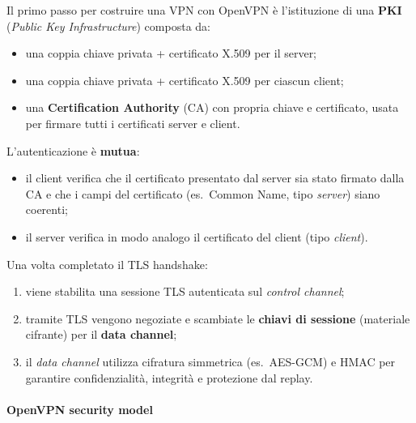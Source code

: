 Il primo passo per costruire una VPN con OpenVPN è l’istituzione di una \textbf{PKI}
(\textit{Public Key Infrastructure}) composta da:
\begin{itemize}
    \item una coppia chiave privata + certificato X.509 per il server;
    \item una coppia chiave privata + certificato X.509 per ciascun client;
    \item una \textbf{Certification Authority} (CA) con propria chiave e certificato,
          usata per firmare tutti i certificati server e client.
\end{itemize}

L’autenticazione è \textbf{mutua}:
\begin{itemize}
    \item il client verifica che il certificato presentato dal server sia stato firmato dalla CA
          e che i campi del certificato (es.\ Common Name, tipo \emph{server}) siano coerenti;
    \item il server verifica in modo analogo il certificato del client (tipo \emph{client}).
\end{itemize}

Una volta completato il TLS handshake:
\begin{enumerate}
    \item viene stabilita una sessione TLS autenticata sul \emph{control channel};
    \item tramite TLS vengono negoziate e scambiate le \textbf{chiavi di sessione}
          (materiale cifrante) per il \textbf{data channel};
    \item il \textit{data channel} utilizza cifratura simmetrica (es.\ AES-GCM) e HMAC
          per garantire confidenzialità, integrità e protezione dal replay.
\end{enumerate}

\paragraph{OpenVPN security model}

